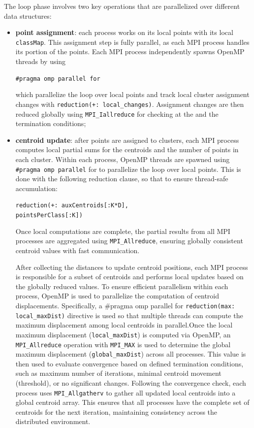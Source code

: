 \documentclass[11pt, journal]{IEEEtran}
\newcommand{\nwl}{

\vspace{11pt}

}
\begin{document}
The loop phase involves two key operations that are parallelized over different data
structures:
\begin{itemize}
    \item \textbf{point assignment}: each process works on its local points with its local \verb|classMap|. This assignment step is fully parallel, as each MPI process handles its portion of the points. Each MPI process independently spawns OpenMP threads by using 
    \begin{center}
        \verb|#pragma omp parallel for|
    \end{center}
    which parallelize the loop over local points and track local cluster assignment changes with \verb|reduction(+: local_changes)|. Assignment changes are then reduced globally using \verb|MPI_Iallreduce| for checking at the and the termination conditions;
    \item \textbf{centroid update}: after points are assigned to clusters, each MPI process computes local partial sums for the centroids and the number of points in each cluster. Within each process, OpenMP threads are spawned using \verb|#pragma omp parallel| for to parallelize the loop over local points. This is done with the following reduction clause, so that to ensure thread-safe accumulation:
    \begin{center}
        \verb|reduction(+: auxCentroids[:K*D],| \\
        \verb|pointsPerClass[:K])|
    \end{center}
    Once local computations are complete, the partial results from all MPI processes are aggregated using \verb|MPI_Allreduce|, ensuring globally consistent centroid values with fast communication.
    \nwl
    After collecting the distances to update centroid positions, each MPI process is responsible for a subset of centroids and performs local updates based on the globally reduced values. To ensure efficient parallelism within each process, OpenMP is used to parallelize the computation of centroid displacements. Specifically, a #pragma omp parallel for \verb|reduction(max: local_maxDist)| directive is used so that multiple threads can compute the maximum displacement among local centroids in parallel.Once the local maximum displacement (\verb|local_maxDist|) is computed via OpenMP, an \verb|MPI_Allreduce| operation with \verb|MPI_MAX| is used to determine the global maximum displacement (\verb|global_maxDist|) across all processes. This value is then used to evaluate convergence based on defined termination conditions, such as maximum number of iterations, minimal centroid movement (threshold), or no significant changes. Following the convergence check, each process uses \verb|MPI_Allgatherv| to gather all updated local centroids into a global centroid array. This ensures that all processes have the complete set of centroids for the next iteration, maintaining consistency across the distributed environment.
\end{itemize}
\nwl
\end{document}
